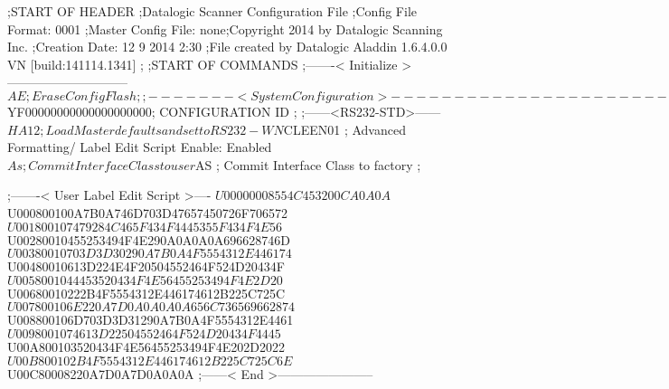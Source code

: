 ;START OF HEADER
;Datalogic Scanner Configuration File
;Config File Format: 0001
;Master Config File: none;Copyright 2014 by Datalogic Scanning Inc.
;Creation Date: 12 9 2014 2:30
;File created by Datalogic Aladdin 1.6.4.0.0 VN [build:141114.1341]
;
;START OF COMMANDS
;-------< Initialize >-----------------------------
$AE                 ; Erase Config Flash
;
;-------< System Configuration >-------------------------------
$YF00000000000000000000; CONFIGURATION ID
;
;------<RS232-STD>------
$HA12               ; Load Master defaults and set to RS232-WN
$CLEEN01            ; Advanced Formatting/ Label Edit Script Enable: Enabled
$As                 ; Commit Interface Class to user
$AS                 ; Commit Interface Class to factory
;

;-------< User Label Edit Script >----
$U00000008554C453200CA0A0A
$U000800100A7B0A746D703D47657450726F706572
$U001800107479284C465F434F4445355F434F4E56
$U00280010455253494F4E290A0A0A0A696628746D
$U00380010703D3D30290A7B0A4F5554312E446174
$U00480010613D224E4F20504552464F524D20434F
$U0058001044453520434F4E56455253494F4E2D20
$U00680010222B4F5554312E446174612B225C725C
$U007800106E220A7D0A0A0A0A656C736569662874
$U008800106D703D3D31290A7B0A4F5554312E4461
$U0098001074613D22504552464F524D20434F4445
$U00A800103520434F4E56455253494F4E202D2022
$U00B800102B4F5554312E446174612B225C725C6E
$U00C80008220A7D0A7D0A0A0A
;------< End >-----------------------
